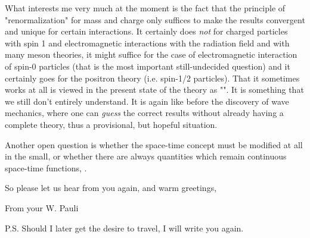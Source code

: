 \documentclass{article}
\begin{document}
What interests me very much at the moment is the fact that the principle of "renormalization" for mass and charge only suffices to make the results convergent and unique for certain interactions. It certainly does \textit{not} for charged particles with spin 1 and electromagnetic interactions with the radiation field and with many meson theories, it might suffice for the case of electromagnetic interaction of spin-0 particles (that is the most important still-undecided question) and it certainly goes for the positron theory (i.e. spin-1/2 particles). That it sometimes works at all is viewed in the present state of the theory as "". It is something that we still don't entirely understand. It is again like before the discovery of wave mechanics, where one can \textit{guess} the correct results without already having a complete theory, thus a provisional, but hopeful situation.

Another open question is whether the space-time concept must be modified at all in the small, or whether there are always quantities which remain continuous space-time functions, .

So please let us hear from you again, and warm greetings,

From your W. Pauli

P.S. Should I later get the desire to travel, I will write you again.
\end{document}
